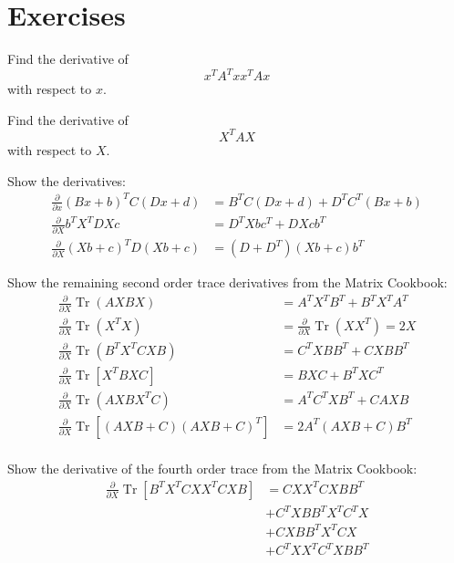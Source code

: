 \section{Exercises}
\begin{exercise}
   Find the derivative of \[x^T A^T x x^T A x\] with respect to $x$.
\end{exercise}

\begin{exercise}
   Find the derivative of \[X^T A X\] with respect to $X$.
\end{exercise}

\begin{exercise}
   Show the derivatives:
   \begin{align*}
   \tag{78}
   \frac{\partial}{\partial x} (Bx+b)^T C (Dx+d)
   &= B^TC(Dx+d) + D^TC^T(Bx+b)
   \\
   \tag{82}
   \frac{\partial}{\partial X} b^T X^T D X c
   &= D^T X b c^T + DXcb^T
   \\
   \tag{83}
   \frac{\partial}{\partial X} (Xb+c)^T D (Xb+c)
   &= (D+D^T)(Xb+c)b^T
   \end{align*}
\end{exercise}

\begin{exercise}
   Show the remaining second order trace derivatives from the Matrix Cookbook:
   \begin{align*}
      \tag{114}
   \frac{\partial}{\partial X} \operatorname{Tr}(A X B X)
   &=A^T X^T B^T+B^T X^T A^T
   \\
   \tag{115}
   \frac{\partial}{\partial X} \operatorname{Tr}\left(X^T X\right)
   &=\frac{\partial}{\partial X} \operatorname{Tr}\left(X X^T\right)=2 X
   \\
   \tag{116}
   \frac{\partial}{\partial X} \operatorname{Tr}\left(B^T X^T C X B\right)
   &=C^T X B B^T+C X B B^T
   \\
   \tag{117}
   \frac{\partial}{\partial X} \operatorname{Tr}\left[X^T B X C\right]
   &=B X C+B^T X C^T
   \\
   \tag{118}
   \frac{\partial}{\partial X} \operatorname{Tr}\left(A X B X^T C\right)
   &=A^T C^T X B^T+C A X B
   \\
   \tag{119}
   \frac{\partial}{\partial X} \operatorname{Tr}\left[(A X B+C)(A X B+C)^T\right]
   &=2 A^T(A X B+C) B^T
   \\
   \end{align*}
\end{exercise}

\begin{exercise}
   Show the derivative of the fourth order trace from the Matrix Cookbook:
   \begin{align*}
      \tag{123}
\frac{\partial}{\partial X} \operatorname{Tr}\left[B^T X^T C X X^T C X B\right]
&= C X X^T C X B B^T 
\\&+ C^T X B B^T X^T C^T X 
\\&+ C X B B^T X^T C X 
\\&+ C^T X X^T C^T X B B^T
   \end{align*}
\end{exercise}
